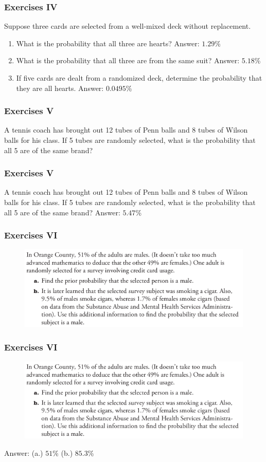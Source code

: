 \documentclass[xcolor=dvipsnames]{beamer}
\begin{document}
\begin{frame}
  \frametitle{Exercises IV}
Suppose three cards are selected from a well-mixed deck without
replacement. 
\begin{enumerate}
\item What is the probability that all three are hearts? Answer: $1.29$\%
\item What is the probability that all three are from the same
  suit? Answer: $5.18$\%
\item If five cards are dealt from a randomized deck, determine
  the probability that they are all hearts. Answer: $0.0495$\%
\end{enumerate}
\end{frame}

\begin{frame}
  \frametitle{Exercises V}
  A tennis coach has brought out 12 tubes of Penn balls and 8 tubes of
  Wilson balls for his class. If 5 tubes are randomly selected, what
  is the probability that all 5 are of the same brand?
\end{frame}

\begin{frame}
  \frametitle{Exercises V}
  A tennis coach has brought out 12 tubes of Penn balls and 8 tubes of
  Wilson balls for his class. If 5 tubes are randomly selected, what
  is the probability that all 5 are of the same brand? Answer: $5.47$\%
\end{frame}

\begin{frame}
  \frametitle{Exercises VI}
\begin{figure}[h]
\includegraphics[scale=.32]{./diagrams/triola_bayes1.png}
\end{figure}
\end{frame}

\begin{frame}
  \frametitle{Exercises VI}
\begin{figure}[h]
\includegraphics[scale=.32]{./diagrams/triola_bayes1.png}
\end{figure}
Answer: (a.) $51$\% (b.) $85.3$\%
\end{frame}
\end{document}
